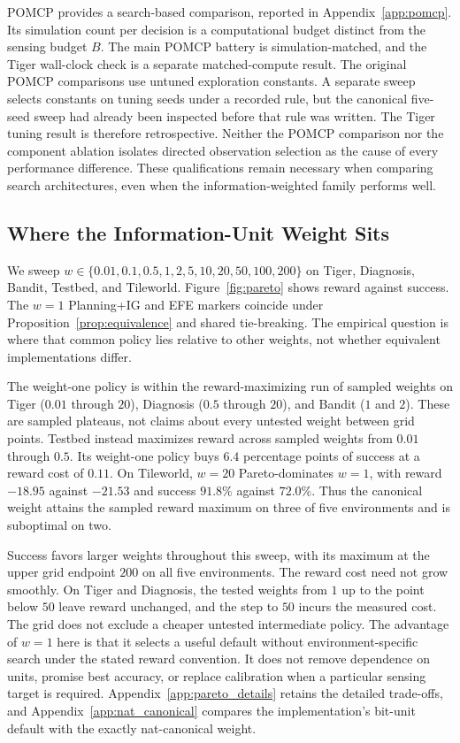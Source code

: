 POMCP provides a search-based comparison, reported in Appendix~\ref{app:pomcp}. Its simulation count per decision is a computational budget distinct from the sensing budget $B$. The main POMCP battery is simulation-matched, and the Tiger wall-clock check is a separate matched-compute result. The original POMCP comparisons use untuned exploration constants. A separate sweep selects constants on tuning seeds under a recorded rule, but the canonical five-seed sweep had already been inspected before that rule was written. The Tiger tuning result is therefore retrospective. Neither the POMCP comparison nor the component ablation isolates directed observation selection as the cause of every performance difference. These qualifications remain necessary when comparing search architectures, even when the information-weighted family performs well.

\subsection{Where the Information-Unit Weight Sits}
\label{sec:pareto}

We sweep $w\in\{0.01,0.1,0.5,1,2,5,10,20,50,100,200\}$ on Tiger, Diagnosis, Bandit, Testbed, and Tileworld. Figure~\ref{fig:pareto} shows reward against success. The $w{=}1$ Planning+IG and EFE markers coincide under Proposition~\ref{prop:equivalence} and shared tie-breaking. The empirical question is where that common policy lies relative to other weights, not whether equivalent implementations differ.


The weight-one policy is within the reward-maximizing run of sampled weights on Tiger ($0.01$ through $20$), Diagnosis ($0.5$ through $20$), and Bandit ($1$ and $2$). These are sampled plateaus, not claims about every untested weight between grid points. Testbed instead maximizes reward across sampled weights from $0.01$ through $0.5$. Its weight-one policy buys $6.4$ percentage points of success at a reward cost of $0.11$. On Tileworld, $w{=}20$ Pareto-dominates $w{=}1$, with reward $-18.95$ against $-21.53$ and success $91.8\%$ against $72.0\%$. Thus the canonical weight attains the sampled reward maximum on three of five environments and is suboptimal on two.

Success favors larger weights throughout this sweep, with its maximum at the upper grid endpoint $200$ on all five environments. The reward cost need not grow smoothly. On Tiger and Diagnosis, the tested weights from $1$ up to the point below $50$ leave reward unchanged, and the step to $50$ incurs the measured cost. The grid does not exclude a cheaper untested intermediate policy. The advantage of $w{=}1$ here is that it selects a useful default without environment-specific search under the stated reward convention. It does not remove dependence on units, promise best accuracy, or replace calibration when a particular sensing target is required. Appendix~\ref{app:pareto_details} retains the detailed trade-offs, and Appendix~\ref{app:nat_canonical} compares the implementation's bit-unit default with the exactly nat-canonical weight.

